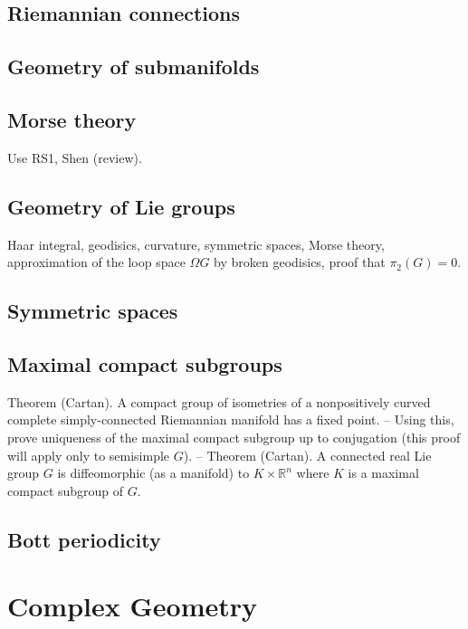 \subsection{Riemannian connections}



\subsection{Geometry of submanifolds}



\subsection{Morse theory}

Use RS1, Shen (review). 


\subsection{Geometry of Lie groups}
Haar integral, geodisics, curvature, symmetric spaces, Morse theory, approximation of the loop space $\Omega G$ by broken geodisics, proof that $\pi_2(G)=0$.


\subsection{Symmetric spaces}


\subsection{Maximal compact subgroups}

Theorem (Cartan). A compact group of isometries of a nonpositively curved complete simply-connected Riemannian manifold has a fixed point.
--
Using this, prove uniqueness of the maximal compact subgroup up to conjugation (this proof will apply only to semisimple $G$).
--
Theorem (Cartan). A connected real Lie group $G$ is diffeomorphic (as a manifold) to $K\times\mathbb{R}^n$ where $K$ is a maximal compact subgroup of $G$.






\subsection{Bott periodicity}




\clearpage
\section{Complex Geometry}


